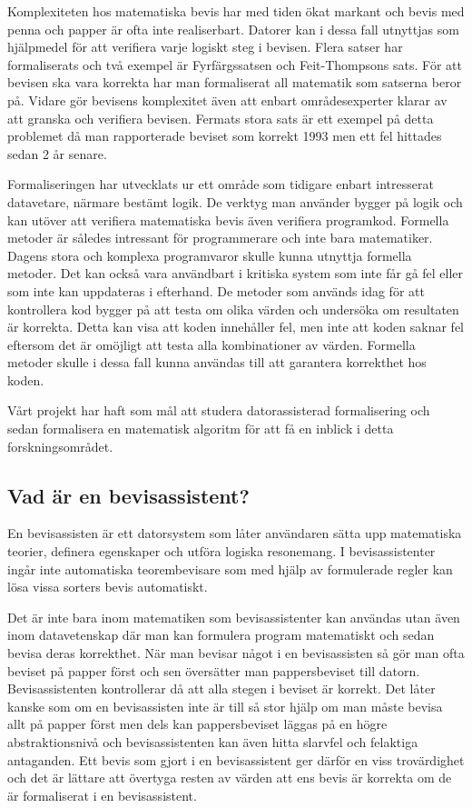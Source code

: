 Komplexiteten hos matematiska bevis har med tiden ökat markant och bevis med
penna och papper är ofta inte realiserbart. Datorer kan i dessa fall utnyttjas
som hjälpmedel för att verifiera varje logiskt steg i bevisen. Flera satser har
formaliserats och två exempel är Fyrfärgssatsen\cite{gonthier2008formal} och
Feit-Thompsons sats\cite{something}. För att bevisen ska vara korrekta har man
formaliserat all matematik som satserna beror på. Vidare gör bevisens
komplexitet även att enbart områdesexperter klarar av att granska och verifiera
bevisen. Fermats stora sats är ett exempel på detta problemet då man
rapporterade beviset som korrekt 1993 men ett fel hittades sedan 2 år
senare\cite{something}.

Formaliseringen har utvecklats ur ett område som tidigare enbart intresserat
datavetare, närmare bestämt logik. De verktyg man använder bygger på logik och
kan utöver att verifiera matematiska bevis även verifiera programkod. Formella
metoder är således intressant för programmerare och inte bara matematiker.
Dagens stora och komplexa programvaror skulle kunna utnyttja formella metoder.
Det kan också vara användbart i kritiska system som inte får gå fel eller som
inte kan uppdateras i efterhand. De metoder som används idag för att
kontrollera kod bygger på att testa om olika värden och undersöka om resultaten
är korrekta. Detta kan visa att koden innehåller fel, men inte att koden saknar
fel eftersom det är omöjligt att testa alla kombinationer av värden. Formella
metoder skulle i dessa fall kunna användas till att garantera korrekthet hos
koden.

Vårt projekt har haft som mål att studera datorassisterad formalisering och
sedan formalisera en matematisk algoritm för att få en inblick i detta
forskningsområdet.


\subsection{Vad är en bevisassistent?}
En bevisassisten är ett datorsystem som låter användaren
sätta upp matematiska teorier, definera egenskaper och utföra logiska
resonemang. I bevisassistenter ingår inte automatiska teorembevisare som
med hjälp av formulerade regler kan lösa vissa sorters bevis automatiskt.

Det är inte bara inom matematiken som bevisassistenter kan användas utan
även inom datavetenskap där man kan formulera program matematiskt och sedan
bevisa deras korrekthet. När man bevisar något i en bevisassisten så gör
man ofta beviset på papper först och sen översätter man pappersbeviset till
datorn. Bevisassistenten kontrollerar då att alla stegen i beviset är korrekt.
Det låter kanske som om en bevisassisten inte är till så stor hjälp om man
måste bevisa allt på papper först men dels kan pappersbeviset läggas på en
högre abstraktionsnivå och bevisassistenten kan även hitta slarvfel och
felaktiga antaganden. Ett bevis som gjort i en bevisassistent ger
därför en viss trovärdighet och det är lättare att övertyga resten av värden
att ens bevis är korrekta om de är formaliserat i en bevisassistent.




